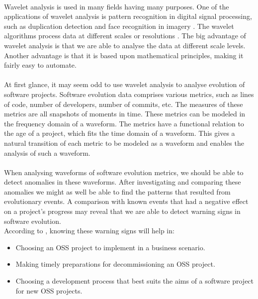 \paragraph{}
Wavelet analysis is used in many fields having many purposes. One of the
applications of wavelet analysis is pattern recognition in digital signal
processing, such as duplication detection and face recognition in imagery
\cite{myna, wadkar}. The wavelet algorithms process data at different scales or
resolutions \cite{graps}. The big advantage of wavelet analysis is that we are
able to analyse the data at different scale levels. Another advantage is that it
is based upon mathematical principles, making it fairly easy to automate.

\paragraph{}
At first glance, it may seem odd to use wavelet analysis to analyse evolution of
software projects. Software evolution data comprises various metrics, such as
lines of code, number of developers, number of commits, etc. The measures of
these metrics are all snapshots of moments in time. These metrics can be
modeled in the frequency domain of a waveform. The metrics have a functional
relation to the age of a project, which fits the time domain of a waveform.
This gives a natural transition of each metric to be modeled as a waveform and
enables the analysis of such a waveform.

\paragraph{}
When analysing waveforms of software evolution metrics, we should be able to
detect anomalies in these waveforms. After investigating and comparing these
anomalies we might as well be able to find the patterns that resulted from
evolutionary events. A comparison with known events that had a negative effect
on a project's progress may reveal that we are able to detect warning signs in
software evolution.\\

\noindent
According to \citet{karus2013}, knowing these warning signs will help in:
\begin{itemize}
	\item Choosing an OSS project to implement in a business scenario.
	\item Making timely preparations for decommissioning an OSS project.
	\item Choosing a development process that best suits the aims of a software
	project for new OSS projects.
\end{itemize}

